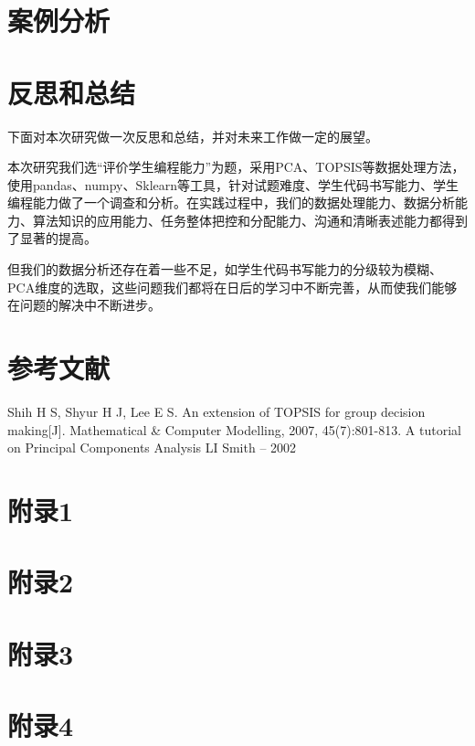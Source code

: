 \documentclass[UTF8]{ctexart}
\begin{document}
	
	
	\section{案例分析}\label{sec4}
	
	
	\section{反思和总结}\label{sec5}
	下面对本次研究做一次反思和总结，并对未来工作做一定的展望。
	\par 本次研究我们选“评价学生编程能力”为题，采用PCA、TOPSIS等数据处理方法，使用pandas、numpy、Sklearn等工具，针对试题难度、学生代码书写能力、学生编程能力做了一个调查和分析。在实践过程中，我们的数据处理能力、数据分析能力、算法知识的应用能力、任务整体把控和分配能力、沟通和清晰表述能力都得到了显著的提高。\\
	\par 但我们的数据分析还存在着一些不足，如学生代码书写能力的分级较为模糊、PCA维度的选取，这些问题我们都将在日后的学习中不断完善，从而使我们能够在问题的解决中不断进步。
	
	\section{参考文献}\label{sec:sec4}
	\small
	\begin{thebibliography}{1}
		 Shih H S, Shyur H J, Lee E S. An extension of TOPSIS for group decision making[J]. Mathematical \& Computer Modelling, 2007, 45(7):801-813.
		 A tutorial on Principal Components Analysis LI Smith – 2002
	\end{thebibliography}
	\begin{appendices} 
		\section{附录1} 
		
		\section{附录2} 
		
		\section{附录3} 
		
		\section{附录4} 
		
	\end{appendices}
	
\end{document}
